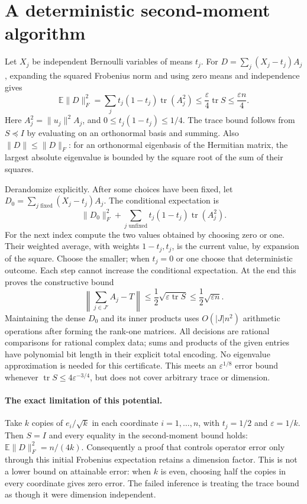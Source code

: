 \documentclass[11pt]{article}
\begin{document}
\section{A deterministic second-moment algorithm}
Let $X_j$ be independent Bernoulli variables of means $t_j$. For
$D=\sum_j(X_j-t_j)A_j$, expanding the squared Frobenius norm and using
zero means and independence gives
\[
\mathbb E\|D\|_F^2=\sum_j t_j(1-t_j)\operatorname{tr}(A_j^2)
\le\frac{\varepsilon}{4}\operatorname{tr}S\le\frac{\varepsilon n}{4}.
\]
Here $A_j^2=\|u_j\|^2A_j$, and $0\le t_j(1-t_j)\le1/4$.
The trace bound follows from $S\preceq I$ by evaluating on an orthonormal
basis and summing. Also $\|D\|\le\|D\|_F$: for an orthonormal eigenbasis
of the Hermitian matrix, the largest absolute eigenvalue is bounded by the
square root of the sum of their squares.

Derandomize explicitly. After some choices have been fixed, let
$D_0=\sum_{j\text{ fixed}}(X_j-t_j)A_j$. The conditional expectation is
\[
\|D_0\|_F^2+\sum_{j\text{ unfixed}}t_j(1-t_j)\operatorname{tr}(A_j^2).
\]
For the next index compute the two values obtained by choosing zero or one.
Their weighted average, with weights $1-t_j,t_j$, is the current value,
by expansion of the square. Choose the smaller; when $t_j=0$ or one choose
that deterministic outcome. Each step cannot increase the conditional
expectation. At the end this proves the constructive bound
\[
\left\|\sum_{j\in J'}A_j-T\right\|
\le\frac12\sqrt{\varepsilon\operatorname{tr}S}
\le\frac12\sqrt{\varepsilon n}.
\]
Maintaining the dense $D_0$ and its inner products uses $O(|J|n^2)$ arithmetic
operations after forming the rank-one matrices. All decisions are rational
comparisons for rational complex data; sums and products of the given entries
have polynomial bit length in their explicit total encoding. No eigenvalue
approximation is needed for this certificate.
This meets an $\varepsilon^{1/8}$ error bound whenever
$\operatorname{tr}S\le4\varepsilon^{-3/4}$, but does not cover arbitrary
trace or dimension.

\paragraph{The exact limitation of this potential.}
Take $k$ copies of $e_i/\sqrt k$ in each coordinate $i=1,\ldots,n$, with
$t_j=1/2$ and $\varepsilon=1/k$. Then $S=I$ and every equality in the
second-moment bound holds:
$\mathbb E\|D\|_F^2=n/(4k)$.
Consequently a proof that controls operator error only through this initial
Frobenius expectation retains a dimension factor. This is not a lower bound
on attainable error: when $k$ is even, choosing half the copies in every
coordinate gives zero error. The failed inference is treating the trace bound
as though it were dimension independent.
\end{document}

